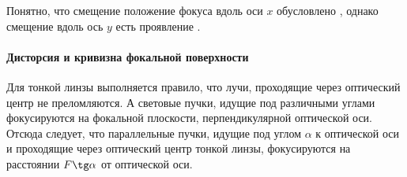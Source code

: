 Понятно, что смещение положение фокуса вдоль оси $x$ обусловлено , однако смещение вдоль ось $y$ есть проявление .

\paragraph{Дисторсия и кривизна фокальной поверхности}
Для тонкой линзы выполняется правило, что лучи, проходящие через оптический центр не преломляются. А световые пучки, идущие под различными углами фокусируются на фокальной плоскости, перпендикулярной оптической оси. Отсюда следует, что параллельные пучки, идущие под углом $\alpha$ к оптической оси и проходящие через оптический центр тонкой линзы, фокусируются на расстоянии $F \tg \alpha$ от оптической оси. 

\begin{figure}[h]
\begin{subfigure}{0.49\tw}
		\caption{}
		\label{pic:pitzval}
	\end{subfigure}
	\hfill
	\begin{subfigure}{0.49\tw}
		\caption{}
		\label{pic:distorsion-y}
	\end{subfigure}
	\caption{}
	
\end{figure}

